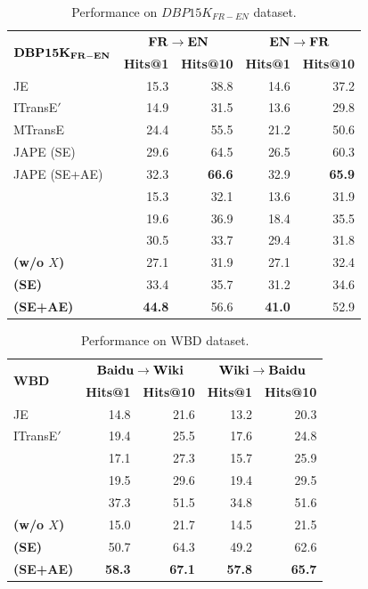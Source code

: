 \begin{table}
	\centering
	\scriptsize
	\begin{tabular}{lrrrr}
		\toprule
		\multirow{2}{*}{$\bf DBP15K_{FR-EN}$} & \multicolumn{2}{c|}{$\bf FR \rightarrow EN$} & \multicolumn{2}{c}{$\bf EN \rightarrow FR$} \\
		& \bf Hits@1 & \bf Hits@10 & \bf Hits@1 & \bf Hits@10 \\
		\midrule
		\rowcolor{Gray}JE & 15.3 & 38.8 & 14.6 & 37.2 \\
		ITransE$'$ & 14.9 & 31.5 & 13.6 & 29.8 \\
		\rowcolor{Gray}MTransE & 24.4 & 55.5 & 21.2 & 50.6 \\
		JAPE (SE) & 29.6 & 64.5 & 26.5 & 60.3 \\
		\rowcolor{Gray}JAPE (SE+AE) & 32.3 & \bf 66.6 & 32.9 & \bf 65.9 \\
		\GCN & 15.3 & 32.1 & 13.6 & 31.9 \\
		\rowcolor{Gray}\HGCN & 19.6 & 36.9 & 18.4 & 35.5 \\
		\RGCN & 30.5 & 33.7 & 29.4 & 31.8 \\
		\rowcolor{Gray}\bf \HRGCN (w/o $X$) & 27.1 & 31.9 & 27.1 & 32.4 \\
		\bf \HRGCN (SE) & 33.4& 35.7& 31.2& 34.6 \\
		\rowcolor{Gray} 	\bf \HRGCN (SE+AE) & \bf 44.8 & 56.6 &\bf 41.0 & 52.9 \\
		\bottomrule
	\end{tabular}
	\caption{Performance on $DBP15K_{FR-EN}$ dataset.}
	\label{cross}
\end{table}

\begin{table}
	\centering
	\scriptsize
	\begin{tabular}{lrrrr}
		\toprule
		\multirow{2}{*}{\bf WBD} &  \multicolumn{2}{c|}{$\bf Baidu \rightarrow Wiki$} & \multicolumn{2}{c}{$\bf Wiki \rightarrow Baidu$} \\
		& \bf Hits@1 & \bf Hits@10 & \bf Hits@1 & \bf Hits@10 \\
		\midrule
		\rowcolor{Gray} JE & 14.8 & 21.6 & 13.2 & 20.3 \\
		ITransE$'$ & 19.4 & 25.5 & 17.6 & 24.8 \\
		\rowcolor{Gray} \GCN & 17.1 & 27.3 & 15.7 & 25.9 \\
		\HGCN & 19.5 & 29.6 & 19.4 & 29.5  \\
		\rowcolor{Gray} \RGCN & 37.3 & 51.5 & 34.8 & 51.6 \\
		\bf \HRGCN (w/o $X$) & 15.0 & 21.7 & 14.5 & 21.5 \\
		\rowcolor{Gray} \bf \HRGCN (SE) & 50.7 & 64.3 & 49.2 & 62.6 \\
		\bf \HRGCN (SE+AE) & \bf 58.3 & \bf 67.1 & \bf 57.8{\tiny } & \bf 65.7 \\
		\bottomrule
	\end{tabular}
	\caption{Performance on WBD dataset.}
	\label{f1}
\vspace{-2mm}
\end{table}

